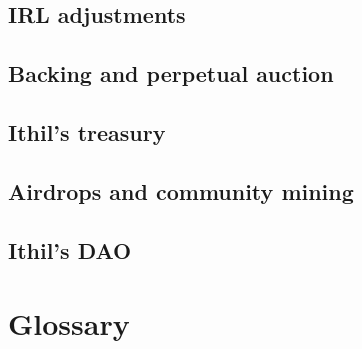 \documentclass[a4paper,10 pt]{article}
\theoremstyle{definition}
\begin{document}
\subsection{IRL adjustments}\label{irladjSub}
\subsection{Backing and perpetual auction}\label{bpaSub}
\subsection{Ithil's treasury}\label{ItSub}
\subsection{Airdrops and community mining}\label{acmSub}
\subsection{Ithil's DAO}\label{daoSub}

\section{Glossary}\label{glossSec}
\end{document}
